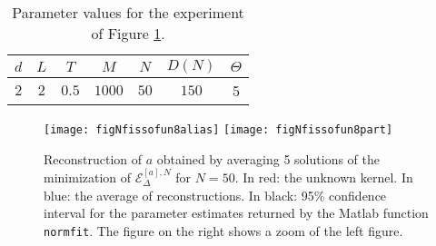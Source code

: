 \begin{table}[h]
\begin{center}
\begin{tabular}{ |c|c|c|c|c|c|c| }
\hline
  $d$ & $L$ & $T$ & $M$ & $N$ & $D(N)$ & $\Theta$ \\
\hline
\hline
  $2$ & $2$ & $0.5$ & $1000$ & $50$ & $150$ & 5  \\
\hline
\end{tabular}
\end{center}
\vspace{-0.5cm}
\caption{Parameter values for the experiment of Figure \ref{fixedN}.} \label{tab:fig5} 
\end{table}

\begin{figure}[h!]
\begin{center}
\hspace{-1cm}
\texttt{[image: figNfissofun8alias]}\hspace{-0.9cm}
\texttt{[image: figNfissofun8part]}
\end{center}
\caption{Reconstruction of $a$ obtained by averaging 5 solutions of the minimization of $\mathcal{E}^{[a],N}_\Delta$ for $N = 50$. In red: the unknown kernel. In blue: the average of reconstructions. In black: 95\% confidence interval for the parameter estimates returned by the Matlab function \texttt{normfit}. The figure on the right shows a zoom of the left figure.}\label{fixedN}
\end{figure}